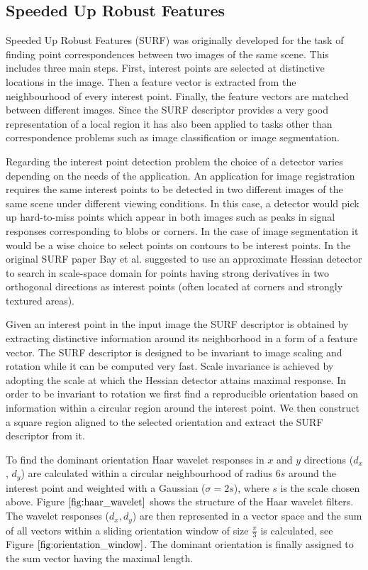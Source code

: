 \documentclass{SMBV13}
\begin{document}
\subsection{Speeded Up Robust Features}
\label{sec:surf}
Speeded Up Robust Features (SURF) \cite{bay2006surf} was originally developed for the task of finding point correspondences between two images of the same scene. This includes three main steps. First, interest points are selected at distinctive locations in the image. Then a feature vector is extracted from the neighbourhood of every interest point. Finally, the feature vectors are matched between different images. Since the SURF descriptor provides a very good representation of a local region it has also been applied to tasks other than correspondence problems such as image classification or image segmentation.

Regarding the interest point detection problem the choice of a detector varies depending on the needs of the application. An application for image registration requires the same interest points to be detected in two different images of the same scene under different viewing conditions. In this case, a detector would pick up hard-to-miss points which appear in both images such as peaks in signal responses corresponding to blobs or corners. In the case of image segmentation it would be a wise choice to select points on contours to be interest points. In the original SURF paper Bay et al. suggested to use an approximate Hessian detector to search in scale-space domain for points having strong derivatives in two orthogonal directions as interest points (often located at corners and strongly textured areas).

Given an interest point in the input image the SURF descriptor is obtained by extracting distinctive information around its neighborhood in a form of a feature vector. The SURF descriptor is designed to be invariant to image scaling and rotation while it can be computed very fast. Scale invariance is achieved by adopting the scale at which the Hessian detector attains maximal response. In order to be invariant to rotation we first find a reproducible orientation based on information within a circular region around the interest point. We then construct a square region aligned to the selected orientation and extract the SURF descriptor from it.

To find the dominant orientation Haar wavelet responses in $x$ and $y$ directions ($d_x$, $d_y$) are calculated within a circular neighbourhood of radius $6s$ around the interest point and weighted with a Gaussian ($\sigma = 2s$), where $s$ is the scale chosen above. Figure $\ref{fig:haar_wavelet}$ shows the structure of the Haar wavelet filters. The wavelet responses ($d_x, d_y$) are then represented in a vector space and the sum of all vectors within a sliding orientation window of size $\frac{\pi}{3}$ is calculated, see Figure $\ref{fig:orientation_window}$. The dominant orientation is finally assigned to the sum vector having the maximal length.
\end{document}
